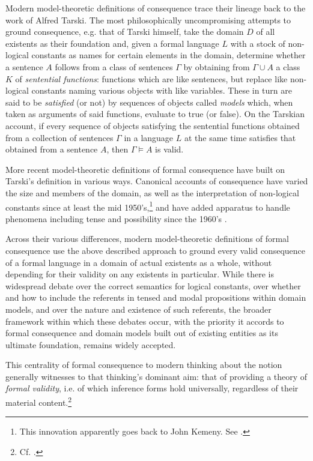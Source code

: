\documentclass[a4paper, 11pt]{article}
\begin{document}
Modern model-theoretic definitions of consequence trace their lineage back to the work of Alfred Tarski. The most philosophically uncompromising attempts to ground consequence, e.g. that of Tarski himself, take the domain $D$ of all existents as their foundation and, given a formal language $L$ with a stock of non-logical constants as names for certain elements in the domain, determine whether a sentence $A$ follows from a class of sentences $\Gamma$ by obtaining  from $\Gamma \cup A$ a class $K$ of \emph{sentential functions}: functions which are like sentences, but replace like non-logical constants naming various objects with like variables. These in turn are said to be \emph{satisfied} (or not) by sequences of objects called \emph{models} which, when taken as arguments of said functions, evaluate to true (or false). On the Tarskian account, if every sequence of objects satisfying the sentential functions obtained from a collection of sentences $\Gamma$ in a language $L$ at the same time satisfies that obtained from a sentence $A$, then $\Gamma \vDash A$ is valid. 

More recent model-theoretic definitions of formal consequence have built on Tarski's definition in various ways. Canonical accounts of consequence have varied the size and members of the domain, as well as the interpretation of non-logical constants since at least the mid 1950's,\footnote{This innovation apparently goes back to John Kemeny. See \autocite{Schiemer2013,Kemeny1956,Kemeny1956b}.} and have added apparatus to handle phenomena including tense and possibility since the 1960's \autocite{Kripke1963a}. 

Across their various differences, modern model-theoretic definitions of formal consequence use the above described approach to ground every valid consequence of a formal language in a domain of actual existents as a whole, without depending for their validity on any existents in particular. While there is widespread debate over the correct semantics for logical constants, over whether and how to include the referents in tensed and modal propositions within domain models, and over the nature and existence of such referents, the broader framework within which these debates occur, with the priority it accords to formal consequence and domain models built out of existing entities as its ultimate foundation, remains widely accepted.

This centrality of formal consequence to modern thinking about the notion generally witnesses to that thinking's dominant aim: that of providing a theory of \emph{formal validity}, i.e. of which inference forms hold universally, regardless of their material content.\footnote{Cf. \autocite{DutilhNovaes2011,Etchemendy2008,MacFarlane2000}.} 
\end{document}
